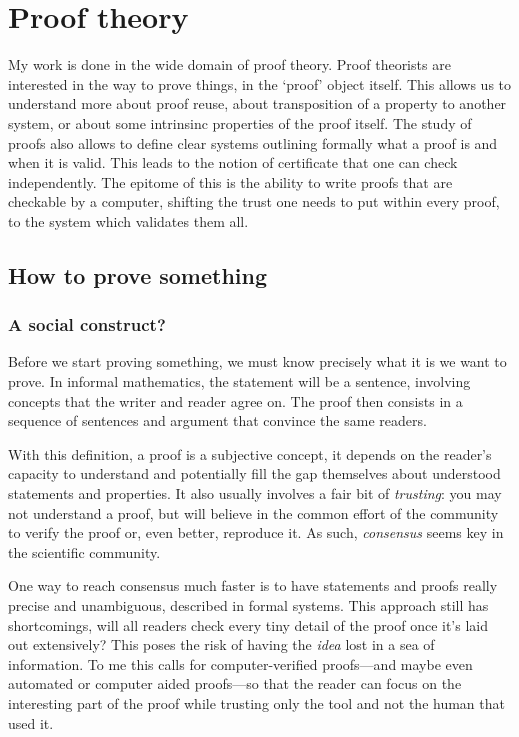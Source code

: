 \chapter{Proof theory}

My work is done in the wide domain of proof theory. Proof theorists are
interested in the way to prove things, in the `proof' object itself.
This allows us to understand more about proof reuse, about transposition of a
property to another system, or about some intrinsinc properties of the proof
itself. The study of proofs also allows to define clear systems outlining
formally what a proof is and when it is valid. This leads to the notion of
certificate that one can check independently. The epitome of this is the ability
to write proofs that are checkable by a computer, shifting the trust one needs
to put within every proof, to the system which validates them all.

\section{How to prove something}

\subsection{A social construct?}

Before we start proving something, we must know precisely what it is we want to
prove. In informal mathematics, the statement will be a sentence, involving
concepts that the writer and reader agree on. The proof then consists in a
sequence of sentences and argument that convince the same readers.

With this definition, a proof is a subjective concept, it depends on the
reader's capacity to understand and potentially fill the gap themselves about
understood statements and properties. It also usually involves a fair bit of
\emph{trusting}: you may not understand a proof, but will believe in
the common effort of the community to verify the proof or, even better,
reproduce it.
As such, \emph{consensus} seems key in the scientific community.

One way to reach consensus much faster is to have statements and proofs really
precise and unambiguous, described in formal systems. This approach still has
shortcomings, will all readers check every tiny detail of the proof once it's
laid out extensively? This poses the risk of having the \emph{idea} lost in a
sea of information.
To me this calls for computer-verified proofs---and maybe even automated or
computer aided proofs---so that the reader can focus on the interesting part of
the proof while trusting only the tool and not the human that used it.

